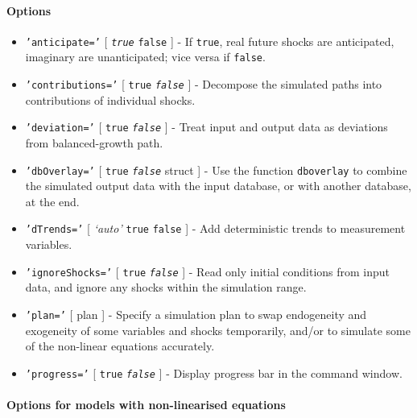  \paragraph{Options}
 
 \begin{itemize}
 \item
   \texttt{'anticipate='} {[} \emph{\texttt{true}} \textbar{}
   \texttt{false} {]} - If \texttt{true}, real future shocks are
   anticipated, imaginary are unanticipated; vice versa if
   \texttt{false}.
 \item
   \texttt{'contributions='} {[} \texttt{true} \textbar{}
   \emph{\texttt{false}} {]} - Decompose the simulated paths into
   contributions of individual shocks.
 \item
   \texttt{'deviation='} {[} \texttt{true} \textbar{}
   \emph{\texttt{false}} {]} - Treat input and output data as deviations
   from balanced-growth path.
 \item
   \texttt{'dbOverlay='} {[} \texttt{true} \textbar{}
   \emph{\texttt{false}} \textbar{} struct {]} - Use the function
   \texttt{dboverlay} to combine the simulated output data with the input
   database, or with another database, at the end.
 \item
   \texttt{'dTrends='} {[} \emph{`auto'} \textbar{} \texttt{true}
   \textbar{} \texttt{false} {]} - Add deterministic trends to
   measurement variables.
 \item
   \texttt{'ignoreShocks='} {[} \texttt{true} \textbar{}
   \emph{\texttt{false}} {]} - Read only initial conditions from input
   data, and ignore any shocks within the simulation range.
 \item
   \texttt{'plan='} {[} plan {]} - Specify a simulation plan to swap
   endogeneity and exogeneity of some variables and shocks temporarily,
   and/or to simulate some of the non-linear equations accurately.
 \item
   \texttt{'progress='} {[} \texttt{true} \textbar{}
   \emph{\texttt{false}} {]} - Display progress bar in the command
   window.
 \end{itemize}
 
 \paragraph{Options for models with non-linearised equations}
 
